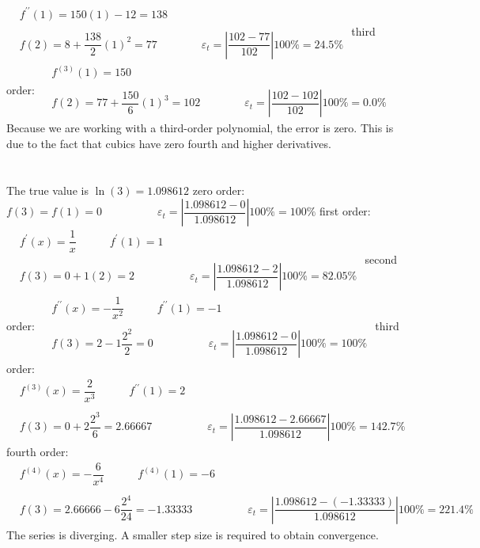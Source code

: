 \documentclass[../main.tex]{subfiles}
\begin{document}
\begin{enumerate}[label=\bfseries(\alph*)]
$
\begin{aligned}
&f^{\prime \prime}(1)=150(1)-12=138 \\ \\
&f(2)=8+\dfrac{138}{2}(1)^{2}=77 \quad\quad\quad\quad\varepsilon_{t}=\left|\dfrac{102-77}{102}\right| 100 \%=24.5 \%
\end{aligned}
$
\bigbreak
third order:
\bigbreak
$
\begin{aligned}
&f^{(3)}(1)=150 \\ \\
&f(2)=77+\dfrac{150}{6}(1)^{3}=102 \quad\quad\quad\quad \varepsilon_{t}=\left|\dfrac{102-102}{102}\right| 100 \%=0.0 \%
\end{aligned}
$
\bigbreak
Because we are working with a third-order polynomial, the error is zero. This is due to the fact that cubics have zero fourth and higher derivatives.
\bigbreak

\section{}
The true value is $\ln (3)=1.098612$
\bigbreak
zero order:
\bigbreak
$f(3)=f(1)=0 \quad\quad\quad\quad\quad \varepsilon_{t}=\left|\dfrac{1.098612-0}{1.098612}\right| 100 \%=100 \%$
\bigbreak
first order:
\bigbreak$
\begin{aligned}
&f^{\prime}(x)=\dfrac{1}{x}  \quad\quad\quad f^{\prime}(1)=1 \\\\
&f(3)=0+1(2)=2 \quad\quad\quad\quad\quad \varepsilon_{t}=\left|\dfrac{1.098612-2}{1.098612}\right| 100 \%=82.05 \%
\end{aligned}$
\bigbreak
second order:
\bigbreak$
\begin{aligned}
&f^{\prime \prime}(x)=-\dfrac{1}{x^{2}} \quad\quad \quad f^{\prime \prime}(1)=-1 \\\\
&f(3)=2-1 \dfrac{2^{2}}{2}=0 \quad\quad\quad\quad\quad \varepsilon_{t}=\left|\dfrac{1.098612-0}{1.098612}\right| 100 \%=100 \%
\end{aligned}$
\bigbreak
third order:
\bigbreak$
\begin{aligned}
&f^{(3)}(x)=\dfrac{2}{x^{3}} \quad \quad\quad f^{\prime \prime}(1)=2 \\\\
&f(3)=0+2 \dfrac{2^{3}}{6}=2.66667 \quad\quad\quad\quad\quad \varepsilon_{t}=\left|\dfrac{1.098612-2.66667}{1.098612}\right| 100 \%=142.7 \%
\end{aligned}$
\bigbreak
fourth order:
\bigbreak$
\begin{aligned}
&f^{(4)}(x)=-\dfrac{6}{x^{4}}\quad \quad \quad f^{(4)}(1)=-6 \\\\
&f(3)=2.66666-6 \dfrac{2^{4}}{24}=-1.33333 \quad\quad\quad\quad\quad \varepsilon_{t}=\left|\dfrac{1.098612-(-1.33333)}{1.098612}\right| 100 \%=221.4 \%
\end{aligned}$
\bigbreak
The series is diverging. A smaller step size is required to obtain convergence.
\bigbreak



\end{enumerate}
\end{document}
